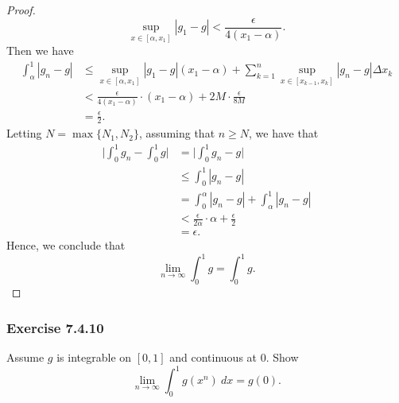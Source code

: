 \begin{proof}
\[ \sup_{x \in [\alpha, x_{1}]} | g_{1} - g  | < \frac{ \epsilon  }{ 4 (x_{1} - \alpha) } .  \]
Then we have 
\begin{align*}
	\int_{ \alpha }^{ 1 }  | g_{n} -g  |  &\leq \sup_{x \in [\alpha, x_{1}]} | g_{1} - g  | (x_{1} - \alpha) + \sum_{ k=1 }^{ n } \sup_{x\in [x_{k-1},x_{k }]} | g_{n} -g  | \Delta x_{k }  \\
										  &< \frac{ \epsilon  }{ 4 ( x_{1} - \alpha) } \cdot (x_{1} - \alpha) + 2M \cdot \frac{ \epsilon  }{ 8M  } \\ 
										  &= \frac{ \epsilon  }{ 2 }.
\end{align*}
Letting \( N = \max \{ N_{1}, N_{2} \}  \), assuming that \( n \geq N   \), we have that 
\begin{align*}
    \Big| \int_{ 0 }^{ 1 } g_{n} - \int_{ 0 }^{ 1 } g  \Big| &= \Big| \int_{ 0 }^{ 1 } g_{n} - g   \Big|  \\
															 &\leq \int_{ 0 }^{ 1 } | g_{n} - g  |  \\
															 &= \int_{ 0 }^{ \alpha } | g_{n} - g |  + \int_{ \alpha  }^{ 1 }  | g_{n} - g  | \\ 
															 &< \frac{ \epsilon  }{ 2 \alpha } \cdot \alpha + \frac{ \epsilon  }{ 2  } \\
															 &= \epsilon.
\end{align*}
Hence, we conclude that
\[  \lim_{ n \to \infty  }  \int_{ 0 }^{ 1 } g  = \int_{ 0 }^{ 1 } g.  \]
\end{proof}


\subsubsection{Exercise 7.4.10} Assume \( g  \) is integrable on \( [0,1]  \) and continuous at \( 0  \). Show 
\[  \lim_{ n \to \infty  } \int_{ 0 }^{ 1 }  g(x^{n}) \ dx = g(0). \]



